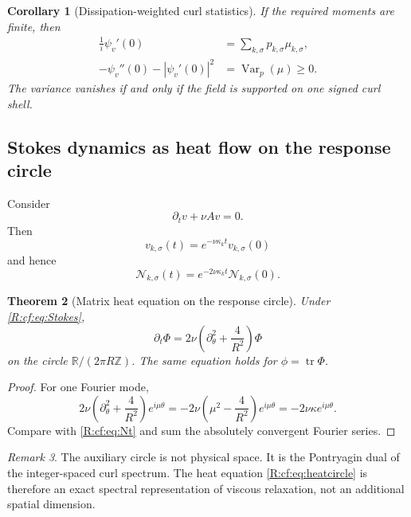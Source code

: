 \documentclass[
 aps,
 prd,
 reprint,
 amsmath,
 amssymb,
 nofootinbib,
 superscriptaddress
]{revtex4-2}
\newtheorem{theorem}{Theorem}[section]
\newtheorem{corollary}[theorem]{Corollary}
\theoremstyle{definition}
\theoremstyle{remark}
\newtheorem{remark}[theorem]{Remark}
\newcommand{\cN}{\mathscr N}
\newcommand{\tr}{\operatorname{tr}}
\begin{document}
\begin{corollary}[Dissipation-weighted curl statistics]
\label{R:cf:cor:curlstats}
If the required moments are finite, then
\begin{align}
 \frac1{i}\psi_v'(0)
 &=
 \sum_{k,\sigma}
 p_{k,\sigma}\mu_{k,\sigma},
 \label{R:cf:eq:meanmu}\\
 -\psi_v''(0)
 -
 \left|\psi_v'(0)\right|^2
 &=
 \operatorname{Var}_{p}(\mu)
 \ge0.
 \label{R:cf:eq:varmu}
\end{align}
The variance vanishes if and only if the field is supported on one signed
curl shell.
\end{corollary}

\subsection{Stokes dynamics as heat flow on the response circle}

Consider
\begin{equation}
       \partial_tv+\nu Av=0.
       \label{R:cf:eq:Stokes}
\end{equation}
Then
\[
       v_{k,\sigma}(t)
       =
       e^{-\nu\kappa_kt}v_{k,\sigma}(0)
\]
and hence
\begin{equation}
 \cN_{k,\sigma}(t)
 =
 e^{-2\nu\kappa_kt}
 \cN_{k,\sigma}(0).
 \label{R:cf:eq:Nt}
\end{equation}

\begin{theorem}[Matrix heat equation on the response circle]
\label{R:cf:thm:heatcircle}
Under \eqref{R:cf:eq:Stokes},
\begin{equation}
 \boxed{
 \partial_t\Phi
 =
 2\nu
 \left(
 \partial_\theta^2+\frac4{R^2}
 \right)\Phi
 }
 \label{R:cf:eq:heatcircle}
\end{equation}
on the circle
$\mathbb R/(2\pi R\mathbb Z)$.
The same equation holds for
$\phi=\tr\Phi$.
\end{theorem}

\begin{proof}
For one Fourier mode,
\[
 2\nu
 \left(
 \partial_\theta^2+\frac4{R^2}
 \right)
 e^{i\mu\theta}
 =
 -2\nu
 \left(
 \mu^2-\frac4{R^2}
 \right)
 e^{i\mu\theta}
 =
 -2\nu\kappa
 e^{i\mu\theta}.
\]
Compare with \eqref{R:cf:eq:Nt} and sum the absolutely convergent Fourier series.
\end{proof}

\begin{remark}
The auxiliary circle is not physical space.  It is the Pontryagin dual of
the integer-spaced curl spectrum.  The heat equation
\eqref{R:cf:eq:heatcircle} is therefore an exact spectral representation of
viscous relaxation, not an additional spatial dimension.
\end{remark}
\end{document}
